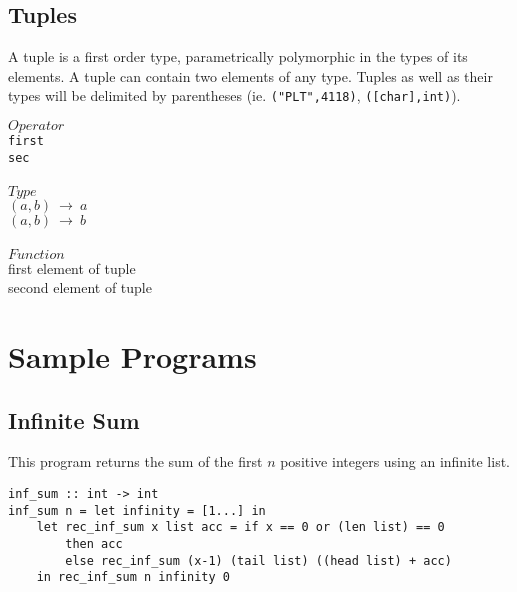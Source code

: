 ﻿\documentclass[5pt]{article}
\begin{document}
\subsection{Tuples}
A tuple is a first order type, parametrically polymorphic in the types of its 
elements. A tuple can contain two elements of any type. Tuples as well as their 
types will be delimited by parentheses (ie. \texttt{("PLT",4118)}, 
\texttt{([char],int)}).
\begin{multicols}{3}
\noindent $Operator$ \\
\hspace*{5mm} \texttt{first} \\
\hspace*{5mm} \texttt{sec} \\
\columnbreak \\
\noindent $Type$ \\
$(a,b) \ \rightarrow \  a$ \\
$(a,b) \ \rightarrow \  b$ \\
\columnbreak \\
\noindent $Function$ \\
first element of tuple \\
second element of tuple \\
\end{multicols}

\section{Sample Programs}
\subsection{Infinite Sum}
This program returns the sum of the first $n$ positive integers using an 
infinite list.
\begin{lstlisting}[language=rippl]
inf_sum :: int -> int
inf_sum n = let infinity = [1...] in
    let rec_inf_sum x list acc = if x == 0 or (len list) == 0
        then acc
        else rec_inf_sum (x-1) (tail list) ((head list) + acc)
    in rec_inf_sum n infinity 0
\end{lstlisting}
\end{document}
